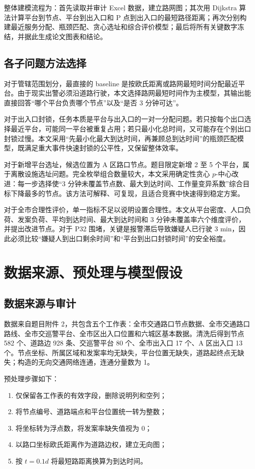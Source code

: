 \documentclass[UTF8,a4paper,12pt]{ctexart}
\begin{document}
整体建模流程为：首先读取并审计 Excel 数据，建立路网图；其次用 Dijkstra 算法计算平台到节点、平台到出入口和 P 点到出入口的最短路径距离；再次分别构建最近服务分配、瓶颈匹配、贪心选址和综合评价模型；最后将所有关键数字冻结，并据此生成论文图表和结论。

\subsection{各子问题方法选择}
对于管辖范围划分，最直接的 baseline 是按欧氏距离或路网最短时间分配最近平台。由于现实出警必须沿道路行驶，本文选择路网最短时间作为主模型，其输出能直接回答“哪个平台负责哪个节点”以及“是否 3 分钟可达”。

对于出入口封锁，任务本质是平台与出入口的一对一分配问题。若只按每个出口选择最近平台，可能同一平台被重复占用；若只最小化总时间，又可能存在个别出口封锁过慢。本文采用“先最小化最大到达时间，再兼顾总到达时间”的瓶颈匹配模型，既满足重大事件快速封锁的公平性，又保留整体效率。

对于新增平台选址，候选位置为 A 区路口节点。题目限定新增 2 至 5 个平台，属于离散设施选址问题。完全枚举组合数量较大，本文采用确定性贪心 $p$-中心改进：每一步选择使“3 分钟未覆盖节点数、最大到达时间、工作量变异系数”综合目标下降最多的节点。该方法可解释、可复现，且适合竞赛中快速得到稳定方案。

对于全市合理性评价，单一指标不足以说明设置合理性。本文从平台密度、人口负荷、发案负荷、平均到达时间、最大到达时间和 3 分钟未覆盖率六个维度评价，并提出改进节点。对于 P32 围堵，关键是报警滞后导致嫌疑人已行驶 3 min，因此必须比较“嫌疑人到出口剩余时间”和“平台到出口封锁时间”的安全裕度。

\section{数据来源、预处理与模型假设}
\subsection{数据来源与审计}
数据来自题目附件 2，共包含五个工作表：全市交通路口节点数据、全市交通路口路线、全市交巡警平台、全市区出入口位置和六城区基本数据。清洗后得到节点 582 个、道路边 928 条、交巡警平台 80 个、全市出入口 17 个、A 区出入口 13 个。节点坐标、所属区域和发案率均无缺失，平台位置无缺失，道路起终点无缺失；构造的无向交通网络连通，连通分量数为 1。

预处理步骤如下：
\begin{enumerate}[label=(\arabic*)]
  \item 仅保留各工作表的有效字段，删除说明列和空列；
  \item 将节点编号、道路端点和平台位置统一转为整数；
  \item 将坐标转为浮点数，将发案率缺失值视为 0；
  \item 以路口坐标欧氏距离作为道路边权，建立无向图；
  \item 按 $t=0.1d$ 将最短路距离换算为到达时间。
\end{enumerate}
\end{document}
